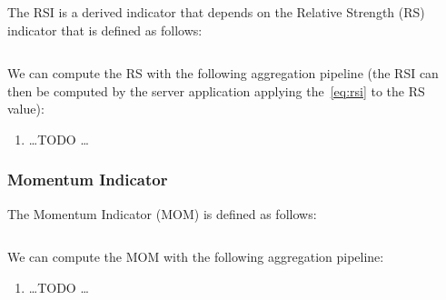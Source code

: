 The RSI is a derived indicator that depends on the Relative Strength (RS)
indicator that is defined as follows:

\begin{equation}\label{eq:rs}
\end{equation}

We can compute the RS with the following aggregation pipeline (the RSI can then
be computed by the server application applying the~\eqref{eq:rsi} to the RS
value):

\begin{enumerate}
	\item \ldots TODO \ldots
\end{enumerate}

\subsubsection{Momentum Indicator}

The Momentum Indicator (MOM) is defined as follows:

\begin{equation}\label{eq:mom}
\end{equation}

We can compute the MOM with the following aggregation pipeline:

\begin{enumerate}
	\item \ldots TODO \ldots
\end{enumerate}
